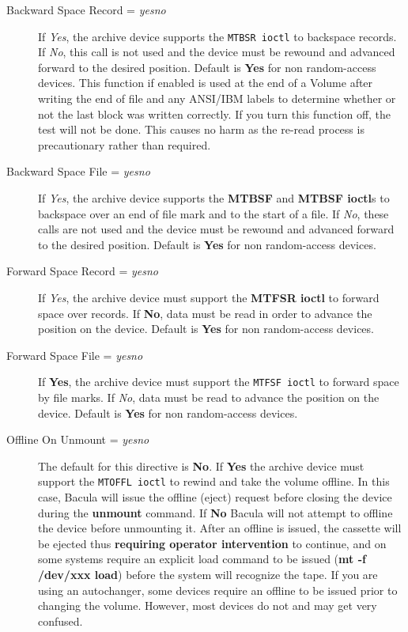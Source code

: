 \begin{description}
\item [Backward Space Record = {\it yes\vb{}no}]
   If {\it Yes}, the archive device supports the {\tt MTBSR ioctl} to backspace
   records. If {\it No}, this call is not used and the device must be rewound
   and advanced forward to the desired position. Default is {\bf Yes} for non
   random-access devices. This function if enabled is used at the end of a
   Volume after writing the end of file and any ANSI/IBM labels to determine
   whether or not the last block was written correctly. If you turn this
   function off, the test will not be done. This causes no harm as the re-read
   process is precautionary rather than required.

\item [Backward Space File = {\it yes\vb{}no}]
   If {\it Yes}, the archive device supports the {\bf MTBSF} and  {\bf MTBSF
  ioctl}s to backspace over an end of file mark and to the  start of a file. If
  {\it No}, these calls are not used and the  device must be rewound and
  advanced forward to the desired position.  Default is {\bf Yes} for non
  random-access devices. 

\item [Forward Space Record = {\it yes\vb{}no}]
   If {\it Yes}, the archive device must support the {\bf MTFSR  ioctl} to
   forward space over records. If {\bf No}, data must  be read in order to
   advance the position on the device. Default is  {\bf Yes} for non
   random-access devices. 

\item [Forward Space File = {\it yes\vb{}no}]
   If {\bf Yes}, the archive device must support the {\tt MTFSF  ioctl} to
   forward space by file marks. If {\it No}, data  must be read to advance the
   position on the device. Default is  {\bf Yes} for non random-access devices. 

\item [Offline On Unmount = {\it yes\vb{}no}]
   The default for this directive is {\bf No}. If {\bf Yes} the  archive device
   must support the {\tt MTOFFL ioctl} to rewind and  take the volume offline. In
   this case, Bacula will issue the  offline (eject) request before closing the
   device during the {\bf unmount}  command. If {\bf No} Bacula will not attempt
   to offline the  device before unmounting it. After an offline is issued,  the
   cassette will be ejected thus {\bf requiring operator intervention}  to
   continue, and on some systems require an explicit load command  to be issued
   ({\bf mt -f /dev/xxx load}) before the system will recognize  the tape. If you
   are using an autochanger, some devices  require an offline to be issued prior
   to changing the volume. However,  most devices do not and may get very
   confused.  


\end{description}
